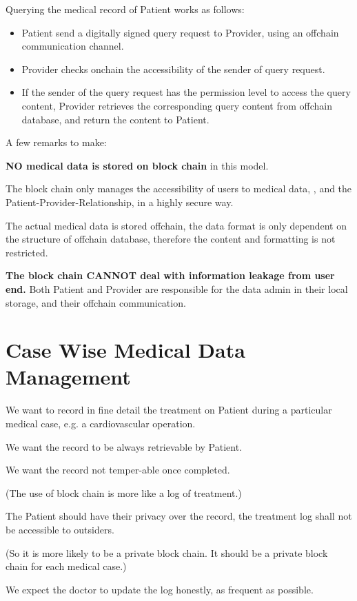 \documentclass[]{scrartcl}
\begin{document}
Querying the medical record of Patient works as follows:

\begin{itemize}
\item Patient send a digitally signed query request to Provider, using an offchain communication channel.

\item Provider checks onchain the accessibility of the sender of query request.

\item If the sender of the query request has the permission level to access the query content, Provider retrieves the corresponding query content from offchain database, and return the content to Patient.
\end{itemize}	

A few remarks to make:
\begin{list}{}{}
	\item \textbf{NO medical data is stored on block chain} in this model.
	
	\item The block chain only manages the accessibility of users to medical data, , and the Patient-Provider-Relationship, in a highly secure way. 
	
	\item The actual medical data is stored offchain, the data format is only dependent on the structure of offchain database, therefore the content and formatting is not restricted.
	
	\item \textbf{The block chain CANNOT deal with information leakage from user end.} Both Patient and Provider are responsible for the data admin in their local storage, and their offchain communication. 
\end{list}

\section{Case Wise Medical Data Management}
We want to record in fine detail the treatment on Patient during a particular medical case, e.g. a cardiovascular operation.

We want the record to be always retrievable by Patient.

We want the record not temper-able once completed.

(The use of block chain is more like a log of treatment.)

The Patient should have their privacy over the record, the treatment log shall not be accessible to outsiders.

(So it is more likely to be a private block chain. It should be a private block chain for each medical case.)

We expect the doctor to update the log honestly, as frequent as possible.
 


\end{document}
